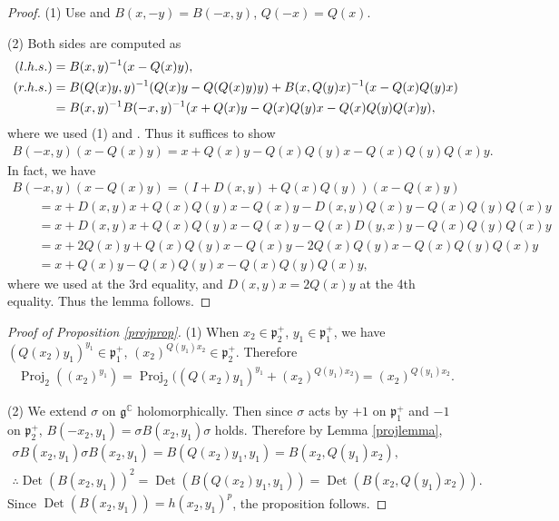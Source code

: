 \documentclass[11pt]{article}
\numberwithin{equation}{section}
\newcommand{\BC}{\mathbb{C}}
\newcommand{\fg}{\mathfrak{g}}
\newcommand{\fp}{\mathfrak{p}}
\newcommand{\Det}{\operatorname{Det}}
\newcommand{\Proj}{\operatorname{Proj}}
\begin{document}
\begin{proof}
(1) Use \cite[Part V, Proposition I.5.1, (J4.2), (J4.2$'$)]{FKKLR} and $B(x,-y)=B(-x,y)$, $Q(-x)=Q(x)$.

(2) Both sides are computed as
\begin{align*}
({\rm l.h.s.})&=B(x,y)^{-1}(x-Q(x)y),\\
({\rm r.h.s.})&=B(Q(x)y,y)^{-1}(Q(x)y-Q(Q(x)y)y)+B(x,Q(y)x)^{-1}(x-Q(x)Q(y)x) \\
&=B(x,y)^{-1}B(-x,y)^{-1}(x+Q(x)y-Q(x)Q(y)x-Q(x)Q(y)Q(x)y),
\end{align*}
where we used (1) and \cite[Part V, Proposition I.4.1]{FKKLR}. Thus it suffices to show
\begin{gather*} B(-x,y)(x-Q(x)y)=x+Q(x)y-Q(x)Q(y)x-Q(x)Q(y)Q(x)y. \end{gather*}
In fact, we have
\begin{gather*}
B(-x,y)(x-Q(x)y) =(I+D(x,y)+Q(x)Q(y))(x-Q(x)y) \\
\qquad{}=x+D(x,y)x+Q(x)Q(y)x-Q(x)y-D(x,y)Q(x)y-Q(x)Q(y)Q(x)y \\
\qquad{}=x+D(x,y)x+Q(x)Q(y)x-Q(x)y-Q(x)D(y,x)y-Q(x)Q(y)Q(x)y \\
\qquad{}=x+2Q(x)y+Q(x)Q(y)x-Q(x)y-2Q(x)Q(y)x-Q(x)Q(y)Q(x)y \\
\qquad{}=x+Q(x)y-Q(x)Q(y)x-Q(x)Q(y)Q(x)y,
\end{gather*}
where we used \cite[Part V, Proposition I.2.1(J1)]{FKKLR} at the 3rd equality, and $D(x,y)x=2Q(x)y$ at the 4th equality.
Thus the lemma follows.
\end{proof}

\begin{proof}[Proof of Proposition \ref{projprop}]
(1) When $x_2\in\fp^+_2$, $y_1\in\fp^+_1$, we have $(Q(x_2)y_1)^{y_1}\in\fp^+_1$, $(x_2)^{Q(y_1)x_2}\allowbreak\in\fp^+_2$. Therefore
\begin{gather*} \Proj_2((x_2)^{y_1})=\Proj_2\big((Q(x_2)y_1)^{y_1}+(x_2)^{Q(y_1)x_2}\big)=(x_2)^{Q(y_1)x_2}. \end{gather*}

(2) We extend $\sigma$ on $\fg^\BC$ holomorphically. Then since $\sigma$ acts by $+1$ on $\fp^+_1$ and $-1$ on $\fp^+_2$,
$B(-x_2,y_1)=\sigma B(x_2,y_1)\sigma$ holds. Therefore by Lemma \ref{projlemma},
\begin{gather*}
\sigma B(x_2,y_1)\sigma B(x_2,y_1)=B(Q(x_2)y_1,y_1)=B(x_2,Q(y_1)x_2), \\
\therefore \Det(B(x_2,y_1))^2=\Det(B(Q(x_2)y_1,y_1))=\Det(B(x_2,Q(y_1)x_2)).
\end{gather*}
Since $\Det(B(x_2,y_1))=h(x_2,y_1)^p$, the proposition follows.
\end{proof}
\end{document}
